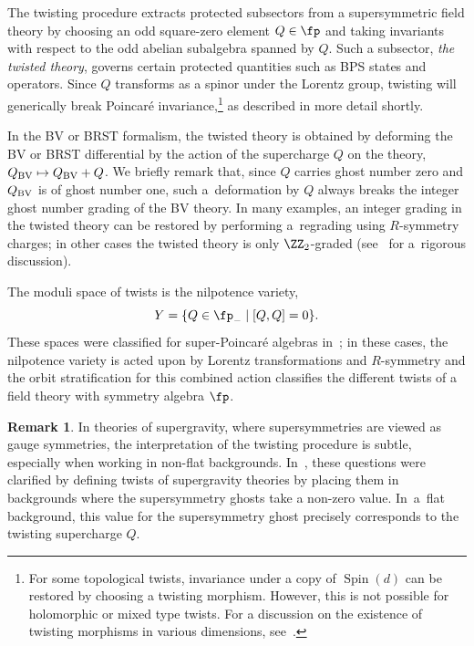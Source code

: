 \documentclass[10pt,a4paper]{amsart}
\numberwithin{equation}{section}
\theoremstyle{definition}
\newtheorem{Remark}[Theorem]{Remark}
\DeclareMathOperator{\Spin}{Spin}
\begin{document}
The twisting procedure extracts protected subsectors from a supersymmetric field theory by choosing an odd square-zero element $Q \in \fp$ and taking invariants with respect to the odd abelian subalgebra spanned by $Q$. Such a subsector, \emph{the twisted theory}, governs certain protected quantities such as BPS states and operators. Since $Q$ transforms as a spinor under the Lorentz group, twisting will generically break Poincar\'e invariance,\footnote{For some topological twists, invariance under a copy of $\Spin(d)$ can be restored by choosing a twisting morphism. However, this is not possible for holomorphic or mixed type twists. For a discussion on the existence of twisting morphisms in various dimensions, see~\cite{ElliottSafronov}.} as described in more detail shortly.

In the BV or BRST formalism, the twisted theory is obtained by deforming the BV or BRST differential by the action of the supercharge $Q$ on the theory,
$
 Q_{\rm BV} \mapsto Q_{\rm BV} + Q$.
We briefly remark that, since $Q$ carries ghost number zero and $Q_{\rm BV}$ is of ghost number one, such a~deformation by $Q$ always breaks the integer ghost number grading of the BV theory. In many examples, an integer grading in the twisted theory can be restored by performing a~regrading using $R$-symmetry charges; in other cases the twisted theory is only $\ZZ_2$-graded (see~\cite{CostelloHol} for a~rigorous discussion).

The moduli space of twists is the nilpotence variety,
\[
 Y = \{ Q \in \fp_- \mid [Q,Q] = 0 \}.
\]
These spaces were classified for super-Poincar\'e algebras in~\cite{NV, ElliottSafronov}; in these cases, the nilpotence variety is acted upon by Lorentz transformations and $R$-symmetry and the orbit stratification for this combined action classifies the different twists of a field theory with symmetry algebra $\fp$.

\begin{Remark}
 In theories of supergravity, where supersymmetries are viewed as gauge symmetries, the interpretation of the twisting procedure is subtle, especially when working in non-flat backgrounds. In~\cite{CostelloLi}, these questions were clarified by defining twists of supergravity theories by placing them in backgrounds where the supersymmetry ghosts take a non-zero value. In~a~flat background, this value for the supersymmetry ghost precisely corresponds to the twisting supercharge $Q$.
\end{Remark}
\end{document}
